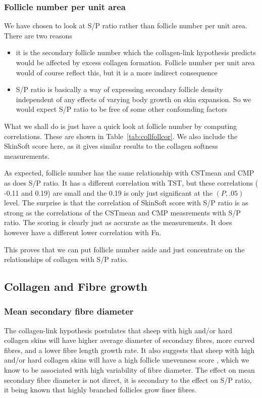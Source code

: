 \documentclass[titlepage]{article}  %
\begin{document}
\subsubsection{Follicle number per unit area}
We have chosen to look at S/P ratio rather than follicle number per unit area. There are two reasons
\begin{itemize}
\item it is the secondary follicle number which the collagen-link hypothesis predicts would be affected by excess collagen formation. Follicle number per unit area would of course reflect this, but it is a more indirect consequence
\item S/P ratio is basically a way of expressing secondary follicle density independent of any effects of varying body growth on skin expansion. So we would expect S/P ratio to be free of some other confounding factors
\end{itemize}

What we shall do is just have a quick look at follicle number by computing correlations. These are shown in Table~\ref{tab:collfollcor}. We also include the SkinSoft score here, as it gives similar results to the collagen softness measurements.

As expected, follicle number has the same relationship with CSTmean and CMP as does S/P ratio. It has a different correlation with TST, but these correlations ( -0.11 and 0.19) are small and the 0.19 is only just significant at the $(P,.05)$ level. The surprise is that the correlation of SkinSoft score with S/P ratio is as strong as the correlations of the CSTmean and CMP measrements with S/P ratio. The scoring is clearly just as accurate as the measurements. It does however have a different lower correlation with Fn. 

This proves that we can put follicle number aside and just concentrate on the relationships of collagen with S/P ratio.


\subsection{Collagen and Fibre growth}
\subsubsection{Mean secondary fibre diameter}
The collagen-link hypothesis postulates that sheep with high and/or hard collagen skins will have higher average diameter of secondary fibres, more curved fibres, and a lower fibre length growth rate. It  also suggests that sheep with high and/or hard collagen skins will have a high follicle unevenness score , which we know to be associated with high variability of fibre diameter. The effect on mean secondary fibre diameter is not direct, it is secondary to the effect on S/P ratio, it being known that highly branched follicles grow finer fibres.
\end{document}
